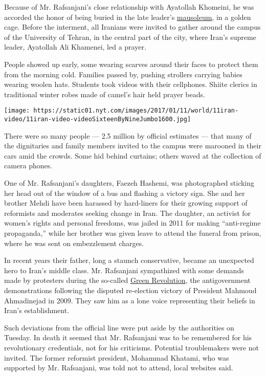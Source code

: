 Because of Mr. Rafsanjani's close relationship with Ayatollah Khomeini,
he was accorded the honor of being buried in the late leader's
\href{https://www.google.co.uk/search?q=khomeini+mausoleum+sciolino\&biw=1718\&bih=912\&tbm=isch\&tbo=u\&source=univ\&sa=X\&ved=0ahUKEwiMqsuqw7fRAhWrLMAKHfWlBHgQsAQIGQ}{mausoleum},
in a golden cage. Before the interment, all Iranians were invited to
gather around the campus of the University of Tehran, in the central
part of the city, where Iran's supreme leader, Ayatollah Ali Khamenei,
led a prayer.

People showed up early, some wearing scarves around their faces to
protect them from the morning cold. Families passed by, pushing
strollers carrying babies wearing woolen hats. Students took videos with
their cellphones. Shiite clerics in traditional winter robes made of
camel's hair held prayer beads.

\texttt{[image: https://static01.nyt.com/images/2017/01/11/world/11iran-video/11iran-video-videoSixteenByNineJumbo1600.jpg]}

There were so many people --- 2.5 million by official estimates --- that
many of the dignitaries and family members invited to the campus were
marooned in their cars amid the crowds. Some hid behind curtains; others
waved at the collection of camera phones.

One of Mr. Rafsanjani's daughters, Faezeh Hashemi, was photographed
sticking her head out of the window of a bus and flashing a victory
sign. She and her brother Mehdi have been harassed by hard-liners for
their growing support of reformists and moderates seeking change in
Iran. The daughter, an activist for women's rights and personal
freedoms, was jailed in 2011 for making ``anti-regime propaganda,''
while her brother was given leave to attend the funeral from prison,
where he was sent on embezzlement charges.

In recent years their father, long a staunch conservative, became an
unexpected hero to Iran's middle class. Mr. Rafsanjani sympathized with
some demands made by protesters during the so-called
\href{http://www.nytimes.com/2009/06/14/world/middleeast/14iran.html}{Green
Revolution}, the antigovernment demonstrations following the disputed
re-election victory of President Mahmoud Ahmadinejad in 2009. They saw
him as a lone voice representing their beliefs in Iran's establishment.

Such deviations from the official line were put aside by the authorities
on Tuesday. In death it seemed that Mr. Rafsanjani was to be remembered
for his revolutionary credentials, not for his criticisms. Potential
troublemakers were not invited. The former reformist president, Mohammad
Khatami, who was supported by Mr. Rafsanjani, was told not to attend,
local websites said.

